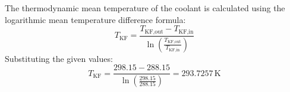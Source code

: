 The thermodynamic mean temperature of the coolant is calculated using the logarithmic mean temperature difference formula:  
\[
T_{\text{KF}} = \frac{T_{\text{KF,out}} - T_{\text{KF,in}}}{\ln \left( \frac{T_{\text{KF,out}}}{T_{\text{KF,in}}} \right)}
\]  
Substituting the given values:  
\[
T_{\text{KF}} = \frac{298.15 - 288.15}{\ln \left( \frac{298.15}{288.15} \right)} = 293.7257 \, \text{K}
\]